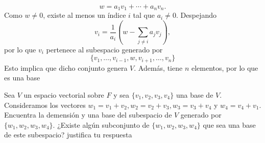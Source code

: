 \documentclass[12pt,a4paper]{article}
\newcommand{\paren}[1]{\left( #1 \right)}
\begin{document}
\begin{solucion}
\begin{enumerate}
\begin{equation*}
                w=a_{1}v_{1}+\cdots+a_{n}v_{n}.
            \end{equation*}
            Como $w\neq0$, existe al menos un índice $i$ tal que $a_{i}\neq0$. Despejando
            \begin{equation*}
                v_{i}=\frac{1}{a_{i}}\paren{w-\sum_{j\neq i}a_{j}v_{j}},
            \end{equation*}
            por lo que $v_{i}$ pertenece al subespacio generado por
            \begin{equation*}
                \{v_{1},\dots,v_{i-1},w,v_{i+1},\dots,v_{n}\}
            \end{equation*}
            Esto implica que dicho conjunto genera $V$. Además, tiene $n$ elementos, por lo que es
            una base
        \end{enumerate}
    \end{solucion}

    \begin{mdframed}[style=mdbluebox,frametitle={Ejercicio 5}]
        Sea $V$ un espacio vectorial sobre $F$ y sea $\{v_{1},v_{2},v_{3},v_{4}\}$ una base de $V$. Consideramos los
        vectores $w_{1}=v_{1}+v_{2},w_{2}=v_{2}+v_{3},w_{3}=v_{3}+v_{4}$ y $w_{4}=v_{4}+v_{1}$. Encuentra la demensión
        y una base del subespacio de $V$ generado por $\{w_{1},w_{2},w_{3},w_{4}\}$. ¿Existe algún subconjunto de $\{w_{1},w_{2},w_{3},w_{4}\}$ que
        sea una base de este subespacio? justifica tu respuesta
    \end{mdframed}
\end{document}
